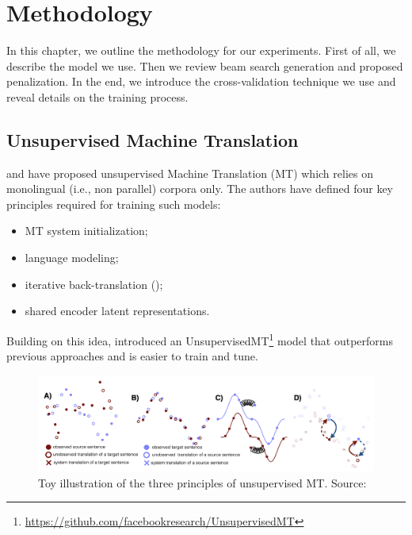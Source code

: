 \chapter{Methodology}
\label{chap:methodology}

In this chapter, we outline the methodology for our experiments. First of all, we describe the model we use. Then we review beam search generation and proposed penalization. In the end, we introduce the cross-validation technique we use and reveal details on the training process.

\section{Unsupervised Machine Translation}
\label{sec:xlm}

\cite{lample2017unsupervised} and \cite{artetxe2018iclr} have proposed unsupervised Machine Translation (MT) which relies on monolingual (i.e., non parallel) corpora only. The authors have defined four key principles required for training such models: 

\begin{itemize}
    \item MT system initialization;
    \item language modeling;
    \item iterative back-translation (\cite{sennrich-etal-2016-improving});
    \item shared encoder latent representations.
\end{itemize}

Building on this idea, \cite{lample2018phrase} introduced an UnsupervisedMT\footnote{\href{https://github.com/facebookresearch/UnsupervisedMT}{https://github.com/facebookresearch/UnsupervisedMT}} model that outperforms previous approaches and is easier to train and tune.

\begin{figure}[h]
    \centering
    \includegraphics[width=14cm]{Images/unsupervisedNMT.png}
    \caption{Toy illustration of the three principles of unsupervised MT. Source: \cite{lample2018phrase}}
    \label{fig:unsupervisedNMT}
\end{figure}

